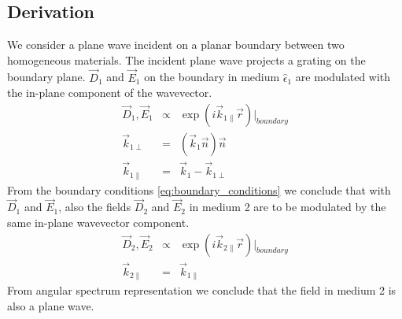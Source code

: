 \documentclass[12pt,a4paper,twoside,openright,BCOR10mm,headsepline,titlepage,abstracton,chapterprefix,final]{scrreprt}
\newcommand\Location{\Vector{r}}
\newcommand\wavenumber{k}
\newcommand\Wavevector{\Vector{\wavenumber}}
\newcommand\Vector[1]{\vec{#1}}
\newcommand\Tensor[1]{\hat{#1}}
\newcommand\scalarEfield{E}
\newcommand\scalarDfield{D}
\newcommand\Efield{\Vector{\scalarEfield}}
\newcommand\Dfield{\Vector{\scalarDfield}}
\newcommand\permittivity{\Tensor{\epsilon}}
\begin{document}
\subsection{Derivation}
We consider a plane wave incident on a planar boundary between two homogeneous materials.
The incident plane wave projects a grating on the boundary plane. $\Dfield_1$ and $\Efield_1$ on the boundary in medium $\permittivity_1$ are modulated with the in-plane component of the wavevector. 
\begin{eqnarray}
 \Dfield_1, \Efield_1 &\propto& \exp( i \Wavevector_{1\parallel} \Location)|_{boundary} \\
 \Wavevector_{1\perp} &=& ( \Wavevector_1 \vec{n} ) \vec{n} \\
 \Wavevector_{1\parallel} &=& \Wavevector_1 - \Wavevector_{1\perp}
\end{eqnarray}
From the boundary conditions \ref{eq:boundary_conditions} we conclude that with $\Dfield_1$ and $\Efield_1$, also the fields $\Dfield_2$ and $\Efield_2$ in medium 2 are to be modulated by the same in-plane wavevector component.
\begin{eqnarray}
  \Dfield_2, \Efield_2 &\propto& \exp( i \Wavevector_{2\parallel} \Location)|_{boundary} \\
  \Wavevector_{2\parallel} &=& \Wavevector_{1\parallel}
\end{eqnarray}
From angular spectrum representation we conclude that the field in medium 2 is also a plane wave. 
\end{document}
